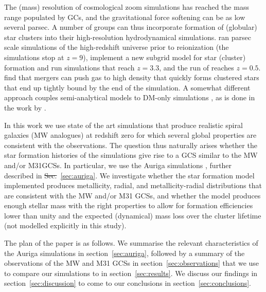 \documentclass[a4paper,fleqn,usenatbib]{mnras}
\providecommand{\DIFadd}[1]{{\protect\color{blue}\uwave{#1}}} %
\providecommand{\DIFdel}[1]{{\protect\color{red}\sout{#1}}}                      %
\providecommand{\DIFaddbegin}{} %
\providecommand{\DIFaddend}{} %
\providecommand{\DIFdelbegin}{} %
\providecommand{\DIFdelend}{} %
\newcommand{\DIFscaledelfig}{0.5}
\newlength{\DIFdelgraphicswidth} %
\newlength{\DIFdelgraphicsheight} %
\newcommand{\DIFaddincludegraphics}[2][]{{\color{blue}\fbox{\DIFOincludegraphics[#1]{#2}}}} %
\newcommand{\DIFdelincludegraphics}[2][]{%
\sbox{\DIFdelgraphicsbox}{\DIFOincludegraphics[#1]{#2}}%
\settoboxwidth{\DIFdelgraphicswidth}{\DIFdelgraphicsbox} %
\settoboxtotalheight{\DIFdelgraphicsheight}{\DIFdelgraphicsbox} %
\scalebox{\DIFscaledelfig}{%
\parbox[b]{\DIFdelgraphicswidth}{\usebox{\DIFdelgraphicsbox}\\[-\baselineskip] \rule{\DIFdelgraphicswidth}{0em}}\llap{\resizebox{\DIFdelgraphicswidth}{\DIFdelgraphicsheight}{%
\setlength{\unitlength}{\DIFdelgraphicswidth}%
\begin{picture}(1,1)%
\thicklines\linethickness{2pt} %
{\color[rgb]{1,0,0}\put(0,0){\framebox(1,1){}}}%
{\color[rgb]{1,0,0}\put(0,0){\line( 1,1){1}}}%
{\color[rgb]{1,0,0}\put(0,1){\line(1,-1){1}}}%
\end{picture}%
}\hspace*{3pt}}} %
} %
\DeclareRobustCommand{\DIFaddbegin}{\DIFOaddbegin \let\includegraphics\DIFaddincludegraphics} %
\DeclareRobustCommand{\DIFaddend}{\DIFOaddend \let\includegraphics\DIFOincludegraphics} %
\DeclareRobustCommand{\DIFdelbegin}{\DIFOdelbegin \let\includegraphics\DIFdelincludegraphics} %
\DeclareRobustCommand{\DIFdelend}{\DIFOaddend \let\includegraphics\DIFOincludegraphics} %
\begin{document}
The (mass) resolution of cosmological zoom simulations has reached the mass range 
populated by GCs, and the gravitational force softening can be as low several 
parsec. A number of groups can thus incorporate formation of (globular) star 
clusters into their high-resolution hydrodynamical simulations. \citet{2016ApJ...831..204R} 
ran parsec scale simulations of the high-redshift universe 
prior to reionization (the simulations stop at $z=9$), \citet{2017ApJ...834...69L} 
implement a new subgrid model for star (cluster) formation and run simulations 
that reach $z=3.3$, and the run of \citet{2017MNRAS.465.3622R} reaches $z=0.5$. 
\citet{2018MNRAS.474.4232K} find that mergers can push gas to high density that
quickly forms clustered stars that end up tightly bound by the end of the 
simulation. A somewhat different approach couples semi-analytical models to DM-only
simulations \citep{2010ApJ...718.1266M,2014ApJ...796...10L,2018MNRAS.480.2343C,
2019MNRAS.486..331C,2019arXiv190505199C}, as is done in the work by 
\citet{2019MNRAS.482.4528E}.

In this work we use state of the art simulations that produce realistic spiral 
galaxies (MW analogues) at redshift zero for which several global properties 
are consistent with the observations. The question thus naturally arises whether 
the star formation histories of the simulations give rise to a GCS similar to 
the MW and/or \DIFaddbegin \DIFadd{Andromeda (}\DIFaddend M31\DIFaddbegin \DIFadd{) }\DIFaddend GCSs. In particular, 
we use the Auriga simulations \citep[][hereafter G17]{2017MNRAS.467..179G}, 
further described in \DIFdelbegin \DIFdel{Sec.}\DIFdelend \DIFaddbegin \DIFadd{Section}\DIFaddend ~\ref{sec:auriga}. We investigate whether the star 
formation model implemented produces metallicity, 
radial, and metallicity-radial distributions that are consistent with the MW 
and/or M31 GCSs, and whether the model produces enough stellar mass with
the right properties to allow for formation efficiencies lower than unity and
the expected (dynamical) mass loss over the cluster lifetime (not modelled 
explicitly in this study). 

The plan of the paper is as follows. We summarise the relevant characteristics 
of the Auriga simulations in section~\ref{sec:auriga}, followed by a summary of 
the observations of the MW and M31 GCSs
in section~\ref{sec:observations} that we use to compare our simulations to in
section~\ref{sec:results}. We discuss our findings in section~\ref{sec:discussion}
to come to our conclusions in section~\ref{sec:conclusions}.
\end{document}
